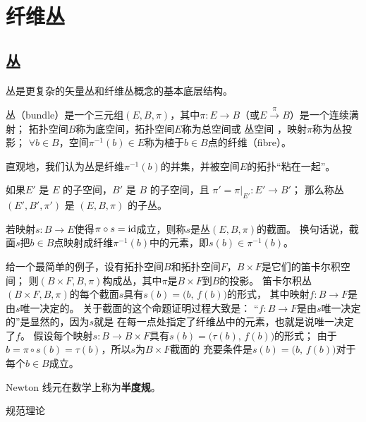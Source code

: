 \chapter{纤维丛}\label{appx:bundle}

\section{丛}
丛是更复杂的矢量丛和纤维丛概念的基本底层结构。

\begin{definition}
    {\heiti 丛}（bundle）是一个三元组$(E, B, \pi)$，其中$\pi: E\to B$（或$E\xrightarrow{\pi} B$）是一个连续满射；
    拓扑空间$B$称为{\heiti 底空间}，拓扑空间$E$称为{\heiti 总空间}或 {\heiti 丛空间} ，映射$\pi$称为{\heiti 丛投影}；
    $\forall b\in B$，空间$\pi^{-1}(b)\in E$称为植于$ b\in B$点的{\heiti 纤维}（fibre）。
\end{definition}
直观地，我们认为丛是纤维$\pi^{-1}(b)$的并集，并被空间$E$的拓扑“粘在一起”。


\begin{definition}
     如果$E'$ 是 $E$ 的子空间，$B'$ 是 $B$ 的子空间，且 $ \pi' = \pi |_{E'}: E'\to B'$；
     那么称丛 $(E',  B',\pi')$ 是 $(E, B,\pi)$ 的{\heiti 子丛}。
\end{definition}

\begin{definition}
    若映射$s: B\to E$使得$\pi \circ s = {\rm id}$成立，则称$s$是丛$(E, B,\pi)$的{\heiti 截面}。
    换句话说，截面$s$把$b\in B$点映射成纤维$\pi^{-1}(b)$中的元素，即$s(b)\in \pi^{-1}(b)$。
\end{definition}
    


给一个最简单的例子，设有拓扑空间$B$和拓扑空间$F$，$B\times F$是它们的笛卡尔积空间；
则$(B\times F, B,\pi)$构成丛，其中$\pi$是$B\times F$到$B$的投影。
笛卡尔积丛$(B \times F, B,\pi)$的每个截面$s$具有$s(b) = \bigl(b,\, f(b)\bigr)$的形式，
其中映射$f: B\to F$是由$s$唯一决定的。
关于截面的这个命题证明过程大致是：
“$f: B\to F$是由$s$唯一决定的”是显然的，因为$s$就是
在每一点处指定了纤维丛中的元素，也就是说唯一决定了$f$。
假设每个映射$s: B\to B\times F$具有$s(b) = \bigl(\tau(b), \, f (b)\bigr)$的形式；
由于$b=\pi \circ s(b) = \tau(b)$，所以$s$为$B\times F$截面的
充要条件是$s(b) = \bigl(b,\, f(b)\bigr)$对于每个$b\in B$成立。

    


Newton 线元在数学上称为\textbf{半度规}。

规范理论